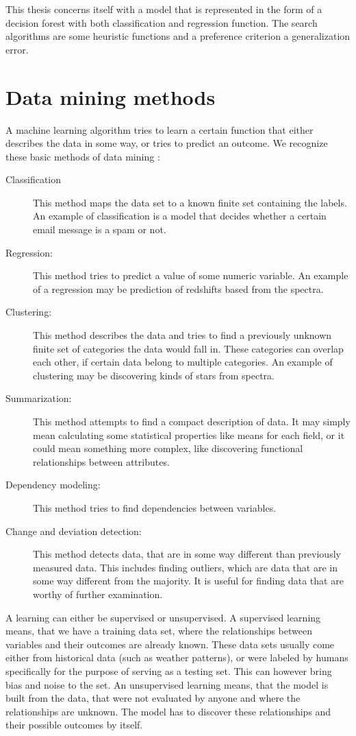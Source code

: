 \documentclass[thesis=B,english]{FITthesis}[2012/10/20]
\begin{document}
This thesis concerns itself with a model that is represented in the form of a decision forest with both classification and regression function. The search algorithms are some heuristic functions and a preference criterion a generalization error.

\section{Data mining methods}
A machine learning algorithm tries to learn a certain function that either describes the data in some way, or tries to predict an outcome. We recognize these basic methods of data mining \cite{fayyad1996data}:
\begin{description}
\item [Classification] This method maps the data set to a known finite set containing the labels. An example of classification is a model that decides whether a certain email message is a spam or not.
\item [Regression:] This method tries to predict a value of some numeric variable. An example of a regression may be prediction of redshifts based from the spectra.
\item [Clustering:] This method describes the data and tries to find a previously unknown finite set of categories the data would fall in. These categories can overlap each other, if certain data belong to multiple categories. An example of clustering may be discovering kinds of stars from spectra.
\item [Summarization:] This method attempts to find a compact description of data. It may simply mean calculating some statistical properties like means for each field, or it could mean something more complex, like discovering functional relationships between attributes.
\item [Dependency modeling:] This method tries to find dependencies between variables. 
\item [Change and deviation detection:] This method detects data, that are in some way different than previously measured data. This includes finding outliers, which are data that are in some way different from the majority. It is useful for finding data that are worthy of further examination.
\end{description}

A learning can either be supervised or unsupervised. A supervised learning means, that we have a training data set, where the relationships between variables and their outcomes are already known. These data sets usually come either from historical data (such as weather patterns), or were labeled by humans specifically for the purpose of serving as a testing set. This can however bring bias and noise to the set. An unsupervised learning means, that the model is built from the data, that were not evaluated by anyone and where the relationships are unknown. The model has to discover these relationships and their possible outcomes by itself.
\end{document}
